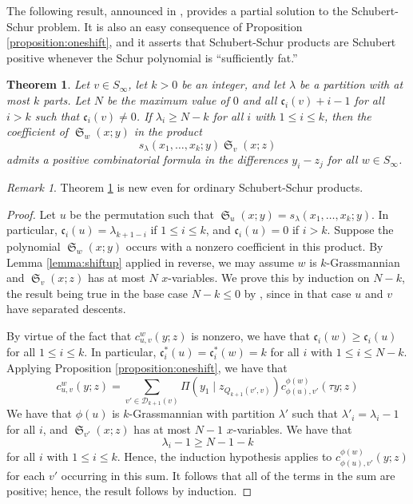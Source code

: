 \documentclass[reqno]{amsart}
\newtheorem{theorem}{Theorem}[section]
\theoremstyle{definition}
\theoremstyle{remark}
\newtheorem*{remark}{Remark}
\numberwithin{equation}{subsection}
\DeclareMathOperator{\sch}{\mathfrak{S}}
\newcommand{\smpfu}{\mathsf{\Pi}}
\newcommand{\smpre}[2]{\ensuremath{}\smpfu\left( #1 \mid #2\right)}
\newcommand{\shifthom}{\tau}
\newcommand{\code}{\mathfrak{c}}
\begin{document}
The following result, announced in \cite{mathovschub}, provides a partial solution to the Schubert-Schur problem. It is also an easy consequence of Proposition \ref{proposition:oneshift}, and it asserts that Schubert-Schur products are Schubert positive whenever the Schur polynomial is ``sufficiently fat.'' 

\begin{theorem} \label{theorem:schubschurpiece}
	Let $v\in S_\infty$, let $k>0$ be an integer, and let $\lambda$ be a partition with at most $k$ parts. Let $N$ be the maximum value of $0$ and all $\code_i(v)+i-1$ for all $i>k$ such that $\code_i(v)\neq 0$. If $\lambda_i\geq N-k$ for all $i$ with $1\leq i\leq k$, then the coefficient of $\sch_w(x;y)$ in the product
	$$s_{\lambda}(x_1,\ldots,x_k;y)\sch_v(x;z)$$
	admits a positive combinatorial formula in the differences $y_i-z_j$ for all $w\in S_\infty$.
\end{theorem}

\begin{remark}
	Theorem \ref{theorem:schubschurpiece} is new even for ordinary Schubert-Schur products.
\end{remark}

\begin{proof}
	Let $u$ be the permutation such that $\sch_u(x;y)=s_\lambda(x_1,\ldots,x_k;y)$. In particular, $\code_i(u)=\lambda_{k+1-i}$ if $1\leq i\leq k$, and $\code_i(u)=0$ if $i>k$. Suppose the polynomial $\sch_w(x;y)$ occurs with a nonzero coefficient in this product. By Lemma \ref{lemma:shiftup} applied in reverse, we may assume $w$ is $k$-Grassmannian and $\sch_v(x;z)$ has at most $N$ $x$-variables. We prove this by induction on $N - k$, the result being true in the base case $N-k\leq 0$ by \cite[Theorem~3.1]{samuelmolev}, since in that case $u$ and $v$ have separated descents.
	
	By virtue of the fact that $c_{u,v}^w(y;z)$ is nonzero, we have that $\code_i(w)\geq \code_i(u)$ for all $1\leq i\leq k$. In particular, $\code_i^*(u)=\code_i^*(w)=k$ for all $i$ with $1\leq i\leq N-k$. Applying Proposition \ref{proposition:oneshift}, we have that
	$$c_{u,v}^w(y;z)=\sum_{v'\in \mathcal{D}_{k+1}(v)}\smpre{y_1}{z_{Q_{k+1}(v',v)}}c_{\phi(u),v'}^{\phi(w)}(\shifthom y;z)$$
We have that $\phi(u)$ is $k$-Grassmannian with partition $\lambda'$ such that $\lambda'_i=\lambda_i-1$ for all $i$, and $\sch_{v'}(x;z)$ has at most $N-1$ $x$-variables. We have that
$$\lambda_i-1\geq N-1-k$$
for all $i$ with $1\leq i\leq k$. Hence, the induction hypothesis applies to $c_{\phi(u),v'}^{\phi(w)}(y;z)$ for each $v'$ occurring in this sum. It follows that all of the terms in the sum are positive; hence, the result follows by induction.
\end{proof}
\end{document}
